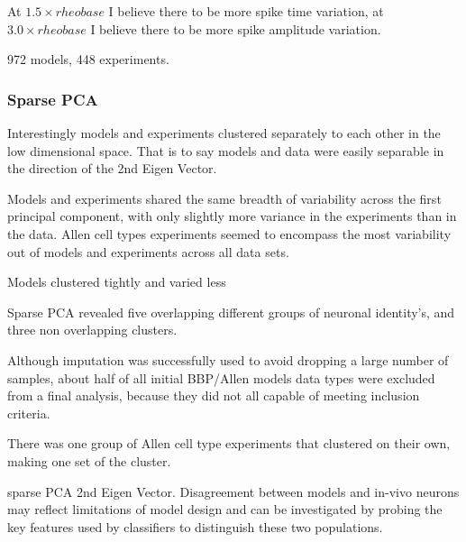 At $1.5 \times rheobase $ I believe there to be more spike time variation, at $3.0 \times rheobase $  I believe there to be more spike amplitude variation.





972 models, 448 experiments.

\subsubsection{Sparse PCA}
Interestingly models and experiments clustered separately to each other in the low dimensional space. That is to say models and data were easily separable in the direction of the 2nd Eigen Vector.

Models and experiments shared the same breadth of variability across the first principal component, with only slightly more variance in the experiments than in the data. Allen cell types experiments seemed to encompass the most variability out of models and experiments across all data sets.


Models clustered tightly and varied less

Sparse PCA revealed five overlapping different groups of neuronal identity's, and three non overlapping clusters.

Although imputation was successfully used to avoid dropping a large number of samples, about half of all initial BBP/Allen models data types were excluded from a final analysis, because they did not all capable of meeting inclusion criteria.  

There was one group of Allen cell type experiments that clustered on their own, making one set of the cluster.

sparse PCA 2nd Eigen Vector. 
Disagreement between models and in-vivo neurons may reflect limitations of model design and can be investigated by probing the key features used by classifiers to distinguish these two populations. 


